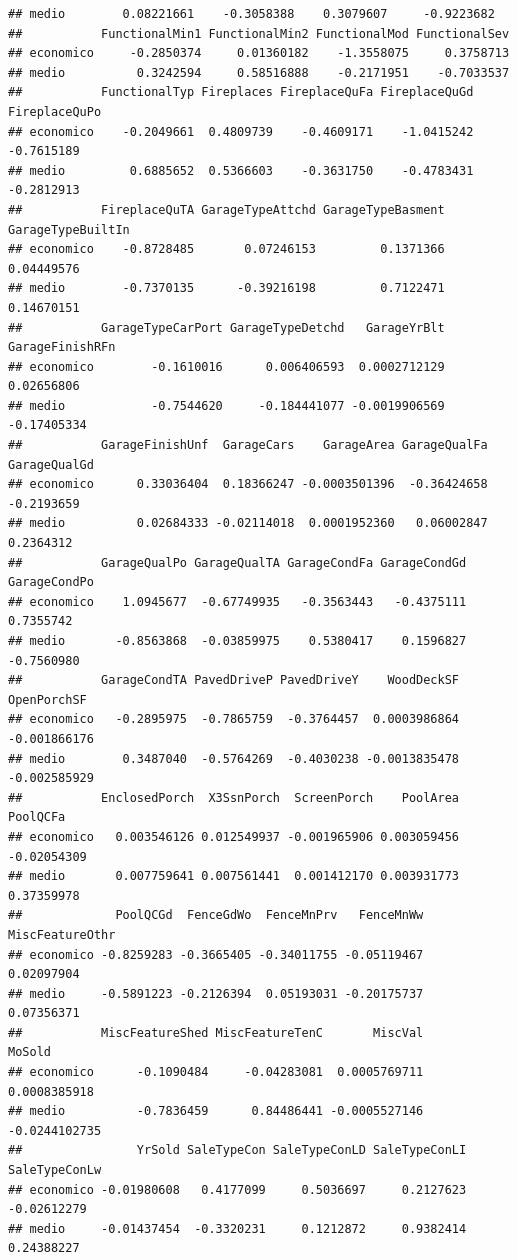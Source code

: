 \documentclass[
]{article}
\begin{document}
\begin{verbatim}
## medio        0.08221661    -0.3058388    0.3079607     -0.9223682
##           FunctionalMin1 FunctionalMin2 FunctionalMod FunctionalSev
## economico     -0.2850374     0.01360182    -1.3558075     0.3758713
## medio          0.3242594     0.58516888    -0.2171951    -0.7033537
##           FunctionalTyp Fireplaces FireplaceQuFa FireplaceQuGd FireplaceQuPo
## economico    -0.2049661  0.4809739    -0.4609171    -1.0415242    -0.7615189
## medio         0.6885652  0.5366603    -0.3631750    -0.4783431    -0.2812913
##           FireplaceQuTA GarageTypeAttchd GarageTypeBasment GarageTypeBuiltIn
## economico    -0.8728485       0.07246153         0.1371366        0.04449576
## medio        -0.7370135      -0.39216198         0.7122471        0.14670151
##           GarageTypeCarPort GarageTypeDetchd   GarageYrBlt GarageFinishRFn
## economico        -0.1610016      0.006406593  0.0002712129      0.02656806
## medio            -0.7544620     -0.184441077 -0.0019906569     -0.17405334
##           GarageFinishUnf  GarageCars    GarageArea GarageQualFa GarageQualGd
## economico      0.33036404  0.18366247 -0.0003501396  -0.36424658   -0.2193659
## medio          0.02684333 -0.02114018  0.0001952360   0.06002847    0.2364312
##           GarageQualPo GarageQualTA GarageCondFa GarageCondGd GarageCondPo
## economico    1.0945677  -0.67749935   -0.3563443   -0.4375111    0.7355742
## medio       -0.8563868  -0.03859975    0.5380417    0.1596827   -0.7560980
##           GarageCondTA PavedDriveP PavedDriveY    WoodDeckSF  OpenPorchSF
## economico   -0.2895975  -0.7865759  -0.3764457  0.0003986864 -0.001866176
## medio        0.3487040  -0.5764269  -0.4030238 -0.0013835478 -0.002585929
##           EnclosedPorch  X3SsnPorch  ScreenPorch    PoolArea    PoolQCFa
## economico   0.003546126 0.012549937 -0.001965906 0.003059456 -0.02054309
## medio       0.007759641 0.007561441  0.001412170 0.003931773  0.37359978
##             PoolQCGd  FenceGdWo  FenceMnPrv   FenceMnWw MiscFeatureOthr
## economico -0.8259283 -0.3665405 -0.34011755 -0.05119467      0.02097904
## medio     -0.5891223 -0.2126394  0.05193031 -0.20175737      0.07356371
##           MiscFeatureShed MiscFeatureTenC       MiscVal        MoSold
## economico      -0.1090484     -0.04283081  0.0005769711  0.0008385918
## medio          -0.7836459      0.84486441 -0.0005527146 -0.0244102735
##                YrSold SaleTypeCon SaleTypeConLD SaleTypeConLI SaleTypeConLw
## economico -0.01980608   0.4177099     0.5036697     0.2127623   -0.02612279
## medio     -0.01437454  -0.3320231     0.1212872     0.9382414    0.24388227

\end{verbatim}
\end{document}
